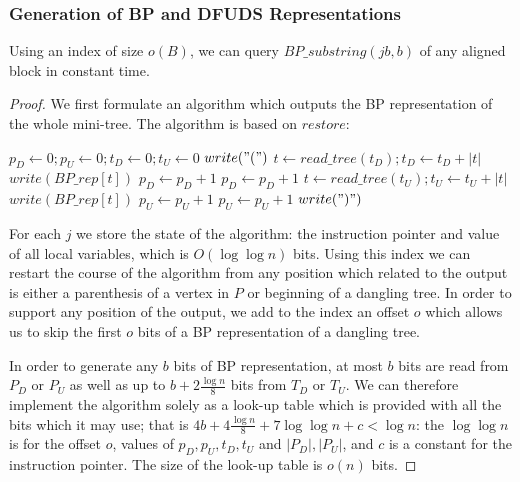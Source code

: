 \subsubsection{Generation of BP and DFUDS Representations}

\begin{lemma}
	Using an index of size $o(B)$, we can query $BP\_substring(j b, b)$ of any aligned block in constant time.
\end{lemma}
\begin{proof}
	We first formulate an algorithm which outputs the BP representation of the whole mini-tree.
	The algorithm is based on $restore$:
	
	\begin{algorithm}
	\begin{algorithmic}
		\State $p_D \gets 0; p_U \gets 0; t_D \gets 0; t_U \gets 0$
			\State $write("(")$
				\State $t \gets read\_tree(t_D); t_D \gets t_D + |t|$
				\State $write(BP\_rep[t])$
				\State $p_D \gets p_D + 1$
			\EndWhile
			\State $p_D \gets p_D + 1$ 
		\EndWhile
				\State $t \gets read\_tree(t_U); t_U \gets t_U + |t|$
				\State $write(BP\_rep[t])$
				\State $p_U \gets p_U + 1$
			\EndWhile
			\State $p_U \gets p_U + 1$ 
			\State $write(")")$
		\EndWhile
	\EndFunction
	\end{algorithmic}
	\end{algorithm}
	
	For each $j$ we store the state of the algorithm: the instruction pointer and value of all local variables, which is $O(\log \log n)$ bits.
	Using this index we can restart the course of the algorithm from any position which related to the output is either a parenthesis of a vertex in $P$ or beginning of a dangling tree.
	In order to support any position of the output, we add to the index an offset $o$ which allows us to skip the first $o$ bits of a BP representation of a dangling tree.
	
	In order to generate any $b$ bits of BP representation, at most $b$ bits are read from $P_D$ or $P_U$ as well as up to $b + 2 \frac{\log n}{8}$ bits from $T_D$ or $T_U$.
	We can therefore implement the algorithm solely as a look-up table which is provided with all the bits which it may use; that is $4b + 4 \frac{\log n}{8} + 7 \log \log n + c < \log n$: the $\log \log n$ is for the offset $o$, values of $p_D, p_U, t_D, t_U$ and $|P_D|, |P_U|$, and $c$ is a constant for the instruction pointer.
	The size of the look-up table is $o(n)$ bits.
\end{proof}

